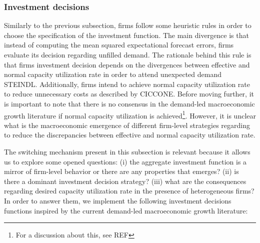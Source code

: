 \documentclass[12pt,openright,oneside,a4paper,english,sumario=tradicional]{gpsabntex}
\numberwithin{listing}{chapter}
\begin{document}
\subsubsection{Investment decisions}
\label{sec:switching_invest}
Similarly to the previous subsection, firms follow some heuristic rules in order to choose the specification of the investment function.
The main divergence is that instead of computing the mean squared expectational forecast errors, firms evaluate its decision regarding unfilled demand.
The rationale behind this rule is that firms investment decision depends on the divergences between effective and normal capacity utilization rate in order to attend unexpected demand STEINDL.
Additionally, firms intend to achieve normal capacity utilization rate to reduce unnecessary costs as described by CICCONE.
Before moving further, it is important to note that there is no consensus in the demand-led macroeconomic growth literature if normal capacity utilization is achieved\footnote{For a discussion about this, see REF}.
However, it is unclear what is the macroeconomic emergence of different firm-level strategies regarding to reduce the discrepancies between effective and normal capacity utilization rate.

The switching mechanism present in this subsection is relevant because it allows us to explore some opened questions:
    (i) the aggregate investment function is a mirror of firm-level behavior or there are any properties that emerges?
    (ii) is there a dominant investment decision strategy?
    (iii) what are the consequences regarding desired capacity utilization rate in the presence of heterogeneous firms?
In order to answer them, we implement the following investment decisions functions inspired by the current demand-led macroeconomic growth literature:
\end{document}
